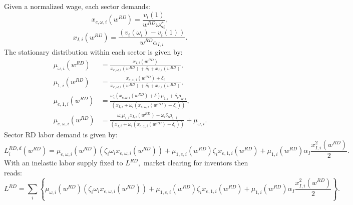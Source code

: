Given a normalized wage, each sector demands:
\begin{equation}
x_{e,\omega,i}\left(w^{RD}\right)=\frac{v_{i}(1)}{w^{RD}\omega\zeta_{i}},\label{eq: eRD}
\end{equation}
\begin{equation}
x_{I,i}\left(w^{RD}\right)=\frac{\left(v_{i}(\omega_{i})-v_{i}(1)\right)}{w^{RD}\alpha_{I,i}}.\label{eq: IRD}
\end{equation}
The stationary distribution within each sector is given by:
\begin{align}
\mu_{\omega,i}\left(w^{RD}\right) & =\frac{x_{I,i}\left(w^{RD}\right)}{x_{e,\omega,i}\left(w^{RD}\right)+\delta_{i}+x_{I,i}\left(w^{RD}\right)},\label{eq: StatDist1}\\
\mu_{1,i}\left(w^{RD}\right) & =\frac{x_{e,\omega,i}\left(w^{RD}\right)+\delta_{i}}{x_{e,\omega,i}\left(w^{RD}\right)+\delta_{i}+x_{I,i}\left(w^{RD}\right)},\label{eq: StatDist2}\\
\mu_{e,1,i}\left(w^{RD}\right) & =\frac{\omega_{i}\left(x_{e,\omega,i}\left(w^{RD}\right)+\delta\right)\mu_{1,i}+\delta_{i}\mu_{\omega,i}}{\left(x_{I,i}+\omega_{i}\left(x_{e,\omega,i}\left(w^{RD}\right)+\delta_{i}\right)\right)},\label{eq: statDist3}\\
\mu_{e,\omega,i}\left(w^{RD}\right) & =\frac{\omega_{i}\mu_{1,i}x_{I,i}\left(w^{RD}\right)-\omega_{i}\delta_{i}\mu_{\omega,i}}{\left(x_{I,i}+\omega_{i}\left(x_{e,\omega,i}\left(w^{RD}\right)+\delta_{i}\right)\right)}+\mu_{\omega,i}.\label{eq: statDist4}
\end{align}
Sector RD labor demand is given by:
\[
L_{i}^{RD,d}\left(w^{RD}\right)=\mu_{e,\omega,i}\left(w^{RD}\right)\left(\zeta_{i}\omega_{i}x_{e,\omega,i}\left(w^{RD}\right)\right)+\mu_{1,e,i}\left(w^{RD}\right)\zeta_{i}x_{e,1,i}\left(w^{RD}\right)+\mu_{1,i}\left(w^{RD}\right)\alpha_{I}\frac{x_{I,i}^{2}\left(w^{RD}\right)}{2}.
\]
With an inelastic labor supply fixed to $L^{RD},$ market clearing
for inventors then reads:
\begin{equation}
L^{RD}=\sum_{i}\left\{ \mu_{\omega,i}\left(w^{RD}\right)\left(\zeta_{i}\omega_{i}x_{e,\omega,i}\left(w^{RD}\right)\right)+\mu_{1,e,i}\left(w^{RD}\right)\zeta_{i}x_{e,1,i}\left(w^{RD}\right)+\mu_{1,i}\left(w^{RD}\right)\alpha_{I}\frac{x_{I,i}^{2}\left(w^{RD}\right)}{2}\right\} .\label{eq:Inventor Clearing}
\end{equation}

